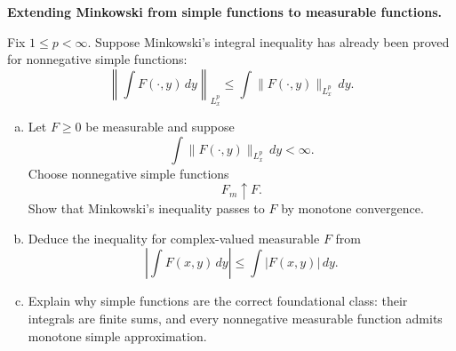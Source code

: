 \begin{problem}[CP-III-0017]
\label{prob:cp-iii-0017}
\textbf{Extending Minkowski from simple functions to measurable functions.}

Fix \(1\le p<\infty\). Suppose Minkowski's integral inequality has already
been proved for nonnegative simple functions:
\[
\left\|
\int F(\cdot,y)\,dy
\right\|_{L_x^p}
\le
\int
\|F(\cdot,y)\|_{L_x^p}\,dy.
\]

\begin{enumerate}[(a)]
\item Let \(F\ge0\) be measurable and suppose
\[
\int
\|F(\cdot,y)\|_{L_x^p}\,dy
<\infty.
\]
Choose nonnegative simple functions
\[
F_m\uparrow F.
\]
Show that Minkowski's inequality passes to \(F\) by monotone convergence.

\item Deduce the inequality for complex-valued measurable \(F\) from
\[
\left|
\int F(x,y)\,dy
\right|
\le
\int|F(x,y)|\,dy.
\]

\item Explain why simple functions are the correct foundational class:
their integrals are finite sums, and every nonnegative measurable
function admits monotone simple approximation.
\end{enumerate}
\end{problem}

